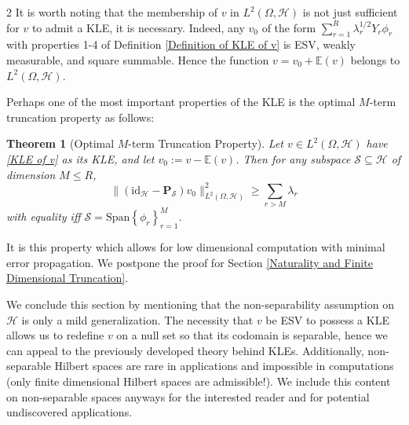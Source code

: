 \documentclass{article}
\newtheorem{theorem}{Theorem}
\numberwithin{theorem}{section}
\numberwithin{lemma}{section}
\numberwithin{definition}{section}
\numberwithin{assumption}{section}
\numberwithin{proposition}{section}
\numberwithin{remark}{section}
\numberwithin{corollary}{section}
\numberwithin{conjecture}{section}
\numberwithin{example}{section}
\newcommand{\N}{\mathbb{N}}
\newcommand{\E}{\mathbb{E}}
\newcommand{\bset}[1]{\left \lbrace #1 \right \rbrace}
\newcommand{\Span}[1]{\mathrm{Span}\bset{#1}}
\newcommand{\id}{\mathrm{id}}
\newcommand{\D}{\displaystyle}
\newcommand{\intp}[1] {\D \int_\Omega {#1 } \; d \mathbb P}
\newcommand{\CH}{\mathcal H}
\begin{document}
\begin{multicols*}{2}
It is worth noting that the membership of $v$ in $L^2(\Omega, \CH)$ is not just sufficient for $v$ to admit a KLE, it is necessary. Indeed, any $v_0$ of the form $\sum_{r=1}^R \lambda_r^{1/2} Y_r \phi_r$ with properties 1-4 of Definition \ref{Definition of KLE of v} is ESV, weakly measurable, and square summable. Hence the function $v = v_0 + \E(v)$ belongs to $L^2(\Omega, \CH)$. 

Perhaps one of the most important properties of the KLE is the optimal $M$-term truncation property as follows: 

\begin{theorem}[Optimal $M$-term Truncation Property] \label{Optimal M term truncation Property}
	Let $v \in L^2(\Omega, \CH)$ have \eqref{KLE of v} as its KLE, and let $v_0 := v - \E(v)$. Then for any subspace $\mathcal S \subseteq \mathcal H$ of dimension $M \leq R$, $$\|(\id_\CH - \mathbf P_\mathcal S)v_0 \|_{L^2(\Omega, \CH)}^2 \geq \sum_{r > M} \lambda_r $$ with equality iff $\mathcal S = \Span{\phi_r}_{r=1}^M$. 
\end{theorem}

It is this property which allows for low dimensional computation with minimal error propagation. We postpone the proof for Section \ref{Naturality and Finite Dimensional Truncation}.


We conclude this section by mentioning that the non-separability assumption on $\mathcal H$ is only a mild generalization. The necessity that $v$ be ESV to possess a KLE allows us to redefine $v$ on a null set so that its codomain is separable, hence we can appeal to the previously developed theory behind KLEs. Additionally, non-separable Hilbert spaces are rare in applications and impossible in computations (only finite dimensional Hilbert spaces are admissible!). We include this content on non-separable spaces anyways for the interested reader and for potential undiscovered applications. 

\end{multicols*}
\end{document}
